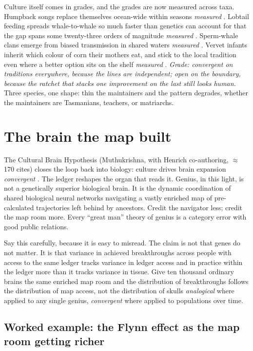 Culture itself comes in grades, and the grades are now measured across taxa. Humpback songs replace themselves ocean-wide within seasons \textit{measured} \citep{garland2011}. Lobtail feeding spreads whale-to-whale so much faster than genetics can account for that the gap spans some twenty-three orders of magnitude \textit{measured} \citep{allen2013}. Sperm-whale clans emerge from biased transmission in shared waters \textit{measured} \citep{cantor2015}. Vervet infants inherit which colour of corn their mothers eat, and stick to the local tradition even where a better option sits on the shelf \textit{measured} \citep{vervet2011}. \textit{Grade: convergent on traditions everywhere, because the lines are independent; open on the boundary, because the ratchet that stacks one improvement on the last still looks human.} Three species, one shape: thin the maintainers and the pattern degrades, whether the maintainers are Tasmanians, teachers, or matriarchs.

\section{The brain the map built}

The Cultural Brain Hypothesis (Muthukrishna, with Henrich co-authoring, $\approx$170 cites) closes the loop back into biology: culture drives brain expansion \textit{convergent} \citep{henrich}. The ledger reshapes the organ that reads it. Genius, in this light, is not a genetically superior biological brain. It is the dynamic coordination of shared biological neural networks navigating a vastly enriched map of pre-calculated trajectories left behind by ancestors. Credit the navigator less; credit the map room more. Every ``great man'' theory of genius is a category error with good public relations.

Say this carefully, because it is easy to misread. The claim is not that genes do not matter. It is that variance in achieved breakthroughs across people with access to the same ledger tracks variance in ledger access and in practice within the ledger more than it tracks variance in tissue. Give ten thousand ordinary brains the same enriched map room and the distribution of breakthroughs follows the distribution of map access, not the distribution of skulls \textit{analogical} where applied to any single genius, \textit{convergent} where applied to populations over time.

\subsection*{Worked example: the Flynn effect as the map room getting richer}


